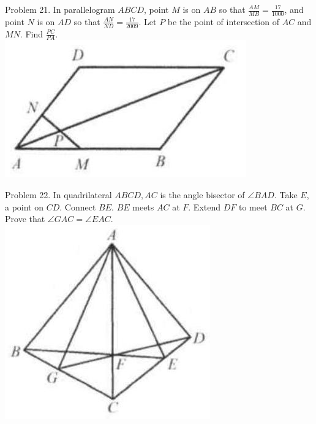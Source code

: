 \documentclass[10pt]{article}
\begin{document}
Problem 21. In parallelogram \(A B C D\), point \(M\) is on \(A B\) so that \(\frac{A M}{M B}=\frac{17}{1000}\), and point \(N\) is on \(A D\) so that \(\frac{A N}{N D}=\frac{17}{2009}\). Let \(P\) be the point of intersection of \(A C\) and \(M N\). Find \(\frac{P C}{P A}\).\\
\includegraphics[max width=\textwidth, center]{2025_04_17_97bc1f7e44d93c271a88g-130(1)}

Problem 22. In quadrilateral \(A B C D, A C\) is the angle bisector of \(\angle B A D\). Take \(E\), a point on \(C D\). Connect \(B E\). \(B E\) meets \(A C\) at \(F\). Extend \(D F\) to meet \(B C\) at \(G\). Prove that \(\angle G A C=\angle E A C\).\\
\includegraphics[max width=\textwidth, center]{2025_04_17_97bc1f7e44d93c271a88g-130}
\end{document}
